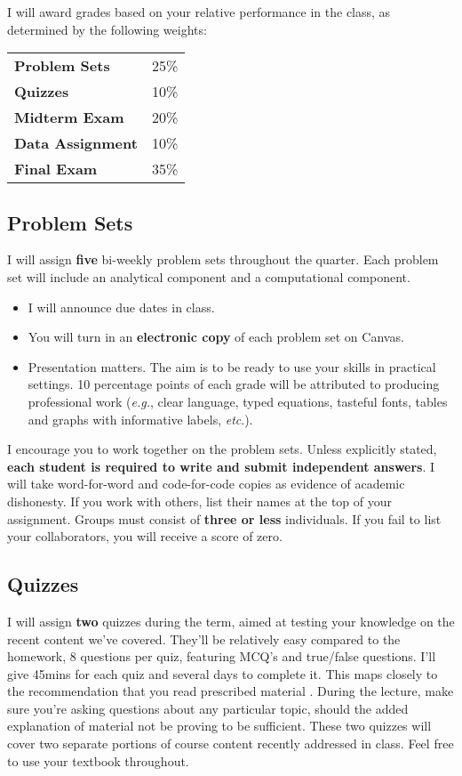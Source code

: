 \documentclass[10pt]{article}
\newcommand{\ra}[1]{\renewcommand{\arraystretch}{#1}}
\begin{document}
I will award grades based on your relative performance in the class, as determined by the following weights:
\begin{table}[!h]
	\ra{1.2}
	\centering
	\begin{tabular}{@{\extracolsep{1cm}}ll@{}}
		\textbf{Problem Sets} & 25\% \\
		\textbf{Quizzes} & 10\% \\
		\textbf{Midterm Exam} & 20\% \\
		\textbf{Data Assignment} & 10\%\\
		\textbf{Final Exam}   & 35\%
	\end{tabular}
\end{table}

\subsection*{Problem Sets} 

I will assign \textbf{five} bi-weekly problem sets throughout the quarter. Each problem set will include an analytical component and a computational component. 
\begin{itemize}
	\setlength{\itemsep}{0pt}
	\item I will announce due dates in class. 
	\item You will turn in an \textbf{electronic copy} of each problem set on Canvas.
	\item Presentation matters. The aim is to be ready to use your skills in practical settings. 10 percentage points of each grade will be attributed to producing professional work (\textit{e.g.}, clear language, typed equations, tasteful fonts, tables and graphs with informative labels, \textit{etc}.).
\end{itemize}
I encourage you to work together on the problem sets. 
Unless explicitly stated, \textbf{each student is required to write and submit independent answers}. 
I will take word-for-word and code-for-code copies as evidence of academic dishonesty. 
If you work with others, list their names at the top of your assignment. Groups must consist of {\bf three or less} individuals. 
If you fail to list your collaborators, you will receive a score of zero.

\subsection*{Quizzes}

I will assign \textbf{two} quizzes during the term, aimed at testing your knowledge on the recent content we've covered.
They'll be relatively easy compared to the homework, 8 questions per quiz, featuring MCQ's and true/false questions. 
I'll give 45mins for each quiz and several days to complete it. 
This maps closely to the recommendation that you read prescribed material . 
During the lecture, make sure you're asking questions about any particular topic, should the added explanation of material not be proving to be sufficient. 
These two quizzes will cover two separate portions of course content recently addressed in class.
Feel free to use your textbook throughout.
\end{document}
